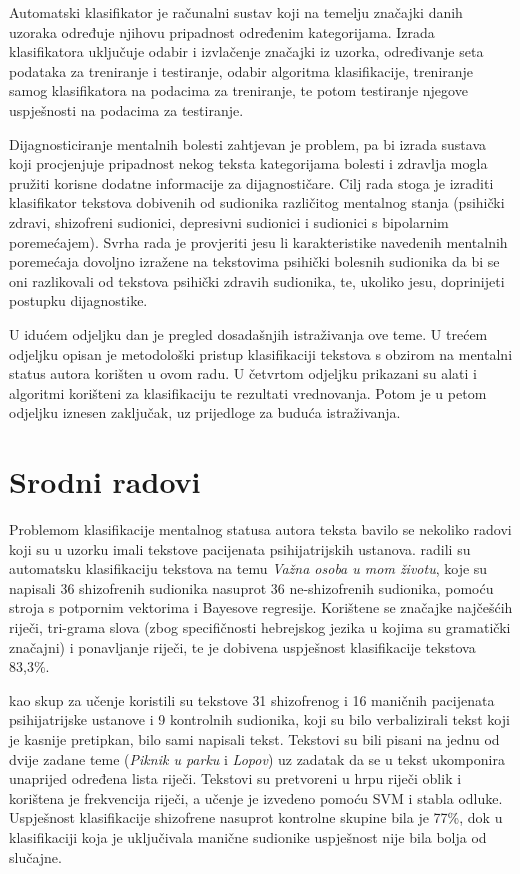\documentclass[10pt, a4paper]{article}
\begin{document}
Automatski klasifikator je računalni sustav koji na temelju značajki danih uzoraka određuje njihovu pripadnost određenim kategorijama. Izrada klasifikatora uključuje odabir i izvlačenje značajki iz uzorka, određivanje seta podataka za treniranje i testiranje, odabir algoritma klasifikacije, treniranje samog klasifikatora na podacima za treniranje, te potom testiranje njegove uspješnosti na podacima za testiranje. 

Dijagnosticiranje mentalnih bolesti zahtjevan je problem, pa bi izrada sustava koji procjenjuje pripadnost nekog teksta kategorijama bolesti i zdravlja mogla pružiti korisne dodatne informacije za dijagnostičare. Cilj rada stoga je izraditi klasifikator tekstova dobivenih od sudionika različitog mentalnog stanja (psihički zdravi, shizofreni sudionici, depresivni sudionici i sudionici s bipolarnim poremećajem). Svrha rada je provjeriti jesu li karakteristike navedenih mentalnih poremećaja dovoljno izražene na tekstovima psihički bolesnih sudionika da bi se oni razlikovali od tekstova psihički zdravih sudionika, te, ukoliko jesu, doprinijeti postupku dijagnostike.

U idućem odjeljku dan je pregled dosadašnjih istraživanja ove teme. U trećem odjeljku opisan je metodološki pristup klasifikaciji tekstova s obzirom na mentalni status autora korišten u ovom radu. U četvrtom odjeljku prikazani su alati i algoritmi korišteni za klasifikaciju te rezultati vrednovanja. Potom je u petom odjeljku iznesen zaključak, uz prijedloge za buduća istraživanja.

\section{Srodni radovi}
Problemom klasifikacije mentalnog statusa autora teksta bavilo se nekoliko radovi koji su u uzorku imali tekstove pacijenata psihijatrijskih ustanova. \citet{strous} radili su automatsku klasifikaciju tekstova na temu \emph{Važna osoba u mom životu}, koje su napisali 36 shizofrenih sudionika nasuprot 36 ne-shizofrenih sudionika, pomoću stroja s potpornim vektorima  i Bayesove regresije. Korištene se značajke najčešćih riječi, tri-grama slova (zbog specifičnosti hebrejskog jezika u kojima su gramatički značajni) i ponavljanje riječi, te je dobivena uspješnost klasifikacije tekstova 83,3\%.

\citet{exray} kao skup za učenje koristili su tekstove 31 shizofrenog i 16 maničnih pacijenata psihijatrijske ustanove i 9 kontrolnih sudionika, koji su bilo verbalizirali tekst koji je kasnije pretipkan, bilo sami napisali tekst. Tekstovi su bili pisani na jednu od dvije zadane teme (\emph{Piknik u parku} i \emph{Lopov}) uz zadatak da se u tekst ukomponira unaprijed određena lista riječi. Tekstovi su pretvoreni u hrpu riječi  oblik i korištena je frekvencija riječi, a učenje je izvedeno pomoću SVM i stabla odluke. Uspješnost klasifikacije shizofrene nasuprot kontrolne skupine bila je 77\%, dok u klasifikaciji koja je uključivala manične sudionike uspješnost nije bila bolja od slučajne. 
\end{document}
